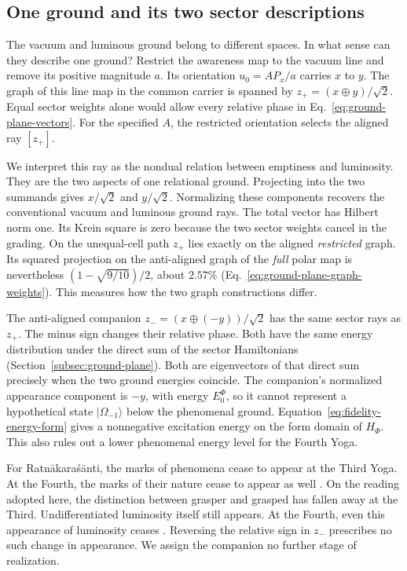 \documentclass[11pt]{article}
\theoremstyle{definition}
\newcommand{\ket}[1]{\lvert #1\rangle}
\begin{document}
\subsection{One ground and its two sector descriptions}
\label{subsec:cognitive-relational-ground}

The vacuum and luminous ground belong to different spaces. In what sense can they describe one ground? Restrict the awareness map to the vacuum line and remove its positive magnitude $a$. Its orientation $u_0=AP_x/a$ carries $x$ to $y$. The graph of this line map in the common carrier is spanned by $z_+=(x\oplus y)/\sqrt2$. Equal sector weights alone would allow every relative phase in Eq.~\eqref{eq:ground-plane-vectors}. For the specified $A$, the restricted orientation selects the aligned ray $[z_+]$.

We interpret this ray as the nondual relation between emptiness and luminosity. They are the two aspects of one relational ground. Projecting into the two summands gives $x/\sqrt2$ and $y/\sqrt2$. Normalizing these components recovers the conventional vacuum and luminous ground rays. The total vector has Hilbert norm one. Its Krein square is zero because the two sector weights cancel in the grading. On the unequal-cell path $z_+$ lies exactly on the aligned \emph{restricted} graph. Its squared projection on the anti-aligned graph of the \emph{full} polar map is nevertheless $(1-\sqrt{9/10})/2$, about $2.57\%$ (Eq.~\eqref{eq:ground-plane-graph-weights}). This measures how the two graph constructions differ.

The anti-aligned companion $z_-=(x\oplus(-y))/\sqrt2$ has the same sector rays as $z_+$. The minus sign changes their relative phase. Both have the same energy distribution under the direct sum of the sector Hamiltonians (Section~\ref{subsec:ground-plane}). Both are eigenvectors of that direct sum precisely when the two ground energies coincide. The companion's normalized appearance component is $-y$, with energy $E_0^\Phi$, so it cannot represent a hypothetical state $\ket{\Omega_{-1}}$ below the phenomenal ground. Equation~\eqref{eq:fidelity-energy-form} gives a nonnegative excitation energy on the form domain of $H_\Phi$. This also rules out a lower phenomenal energy level for the Fourth Yoga.

For Ratn\=akara\'s\=anti, the marks of phenomena cease to appear at the Third Yoga. At the Fourth, the marks of their nature cease to appear as well \cite[pp.~241, 252--253]{Yiannopoulos2017}. On the reading adopted here, the distinction between grasper and grasped has fallen away at the Third. Undifferentiated luminosity itself still appears. At the Fourth, even this appearance of luminosity ceases \cite[pp.~182--185]{Yiannopoulos2012}. Reversing the relative sign in $z_-$ prescribes no such change in appearance. We assign the companion no further stage of realization.
\end{document}
